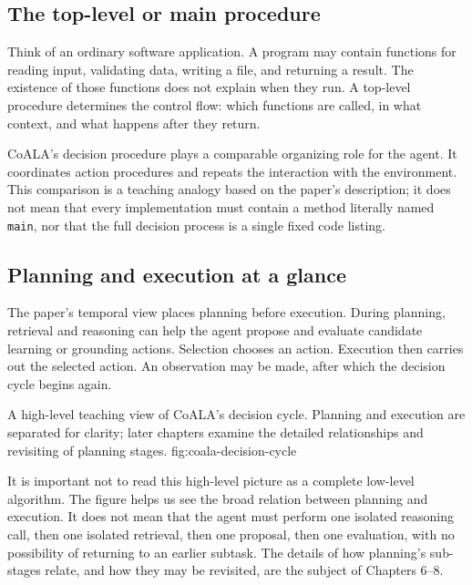 \subsection{The top-level or main procedure}

Think of an ordinary software application. A program may contain functions for reading input, validating data, writing a file, and returning a result. The existence of those functions does not explain when they run. A top-level procedure determines the control flow: which functions are called, in what context, and what happens after they return.

CoALA's decision procedure plays a comparable organizing role for the agent. It coordinates action procedures and repeats the interaction with the environment. This comparison is a teaching analogy based on the paper's description; it does not mean that every implementation must contain a method literally named \texttt{main}, nor that the full decision process is a single fixed code listing.

\subsection{Planning and execution at a glance}

The paper's temporal view places planning before execution. During planning, retrieval and reasoning can help the agent propose and evaluate candidate learning or grounding actions. Selection chooses an action. Execution then carries out the selected action. An observation may be made, after which the decision cycle begins again.

  {A high-level teaching view of CoALA's decision cycle. Planning and execution are separated for clarity; later chapters examine the detailed relationships and revisiting of planning stages.}
  {fig:coala-decision-cycle}

It is important not to read this high-level picture as a complete low-level algorithm. The figure helps us see the broad relation between planning and execution. It does not mean that the agent must perform one isolated reasoning call, then one isolated retrieval, then one proposal, then one evaluation, with no possibility of returning to an earlier subtask. The details of how planning's sub-stages relate, and how they may be revisited, are the subject of Chapters 6--8.


